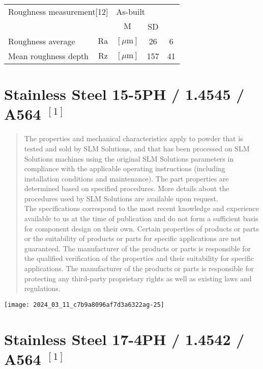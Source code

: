 \documentclass[10pt]{article}
\begin{document}
\begin{center}
\begin{tabular}{|l|cc|c|c|}
\hline
\multicolumn{2}{|l|}{Roughness measurement[12]} & \multicolumn{2}{l|}{As-built} &  \\
\cline { 3 - 5 }
\multicolumn{2}{|l|}{} & $\mathrm{M}$ & SD &  \\
\hline
Roughness average & $\mathrm{Ra}$ & $[\mu \mathrm{m}]$ & 26 & 6 \\
\hline
Mean roughness depth & $\mathrm{Rz}$ & $[\mu \mathrm{m}]$ & 157 & 41 \\
\hline
\end{tabular}
\end{center}

\section*{Stainless Steel 15-5PH / 1.4545 / A564 ${ }^{[1]}$ }
\begin{abstract}
The properties and mechanical characteristics apply to powder that is tested and sold by SLM Solutions, and that has been processed on SLM Solutions machines using the original SLM Solutions parameters in compliance with the applicable operating instructions (including installation conditions and maintenance). The part properties are determined based on specified procedures. More details about the procedures used by SLM Solutions are available upon request.\\
The specifications correspond to the most recent knowledge and experience available to us at the time of publication and do not form a sufficient basis for component design on their own. Certain properties of products or parts or the suitability of products or parts for specific applications are not guaranteed. The manufacturer of the products or parts is responsible for the qualified verification of the properties and their suitability for specific applications. The manufacturer of the products or parts is responsible for protecting any third-party proprietary rights as well as existing laws and regulations.
\end{abstract}

\begin{center}
\texttt{[image: 2024\_03\_11\_c7b9a8096af7d3a6322ag-25]}
\end{center}

\section*{Stainless Steel 17-4PH / 1.4542 / A564 ${ }^{[1]}$}
\end{document}
